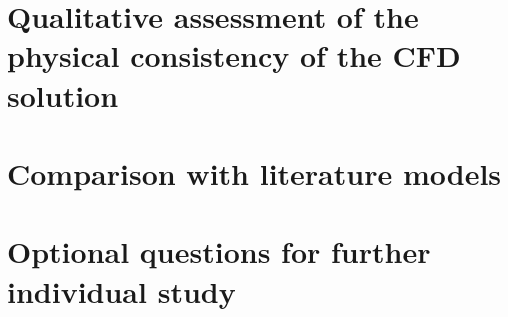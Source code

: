 \documentclass[12pt]{article}
\begin{document}
\section{Qualitative assessment of the physical consistency of the CFD solution} \label{sec:qualitative}

        

\section{Comparison with literature models} \label{sec:literature}

        

\section{Optional questions for further individual study} \label{sec:unstability}

        



\end{document}
